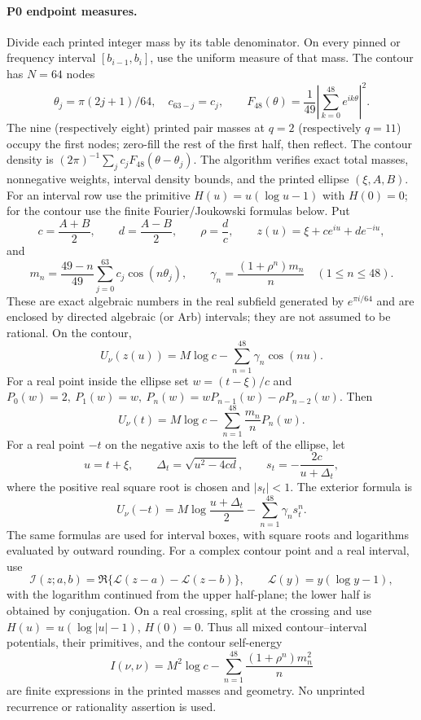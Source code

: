 \paragraph{P0 endpoint measures.}
Divide each printed integer mass by its table denominator. On every pinned or
frequency interval $[b_{i-1},b_i]$, use the uniform measure of that mass.
The contour has $N=64$ nodes
\[
 \theta_j=\pi(2j+1)/64,\quad c_{63-j}=c_j,
 \qquad F_{48}(\theta)=\frac1{49}\left|\sum_{k=0}^{48}e^{ik\theta}\right|^2.
\]
The nine (respectively eight) printed pair masses at $q=2$ (respectively
$q=11$) occupy the first nodes; zero-fill the rest of the first half, then
reflect. The contour density is $(2\pi)^{-1}\sum_jc_jF_{48}(\theta-\theta_j)$.
The algorithm verifies exact total masses, nonnegative weights, interval
density bounds, and the printed ellipse $(\xi,A,B)$. For an interval row use
the primitive $H(u)=u(\log u-1)$ with $H(0)=0$; for the contour use the
finite Fourier/Joukowski formulas below.  Put
\[
 c=\frac{A+B}{2},\qquad d=\frac{A-B}{2},\qquad \rho=\frac dc,\qquad
 z(u)=\xi+ce^{iu}+de^{-iu},
\]
and
\[
 m_n=\frac{49-n}{49}\sum_{j=0}^{63}c_j\cos(n\theta_j),\qquad
 \gamma_n=\frac{(1+\rho^n)m_n}{n}\quad(1\le n\le48).
\]
These are exact algebraic numbers in the real subfield generated by
$e^{\pi i/64}$ and are enclosed by directed algebraic (or Arb) intervals;
they are not assumed to be rational.  On the contour,
\[
 U_\nu(z(u))=M\log c-\sum_{n=1}^{48}\gamma_n\cos(nu).
\]
For a real point inside the ellipse set \(w=(t-\xi)/c\) and
\(P_0(w)=2,\ P_1(w)=w,\ P_n(w)=wP_{n-1}(w)-\rho P_{n-2}(w)\).  Then
\[
 U_\nu(t)=M\log c-\sum_{n=1}^{48}\frac{m_n}{n}P_n(w).
\]
For a real point $-t$ on the negative axis to the left of the ellipse, let
\[
 u=t+\xi,\qquad
 \Delta_t=\sqrt{u^2-4cd},\qquad
 s_t=-\frac{2c}{u+\Delta_t},
\]
where the positive real square root is chosen and \(|s_t|<1\).  The exterior
formula is
\[
 U_\nu(-t)=M\log\frac{u+\Delta_t}{2}
          -\sum_{n=1}^{48}\gamma_n s_t^n.
\]
The same formulas are used for interval boxes, with square roots and
logarithms evaluated by outward rounding.  For a complex contour point and a
real interval, use
\[
 \mathcal I(z;a,b)=\Re\{\mathcal L(z-a)-\mathcal L(z-b)\},\qquad
 \mathcal L(y)=y(\log y-1),
\]
with the logarithm continued from the upper half-plane; the lower half is
obtained by conjugation.  On a real crossing, split at the crossing and use
$H(u)=u(\log|u|-1)$, $H(0)=0$.  Thus all mixed contour--interval
potentials, their primitives, and the contour self-energy
\[
 I(\nu,\nu)=M^2\log c-\sum_{n=1}^{48}\frac{(1+\rho^n)m_n^2}{n}
\]
are finite expressions in the printed masses and geometry.  No unprinted
recurrence or rationality assertion is used.

